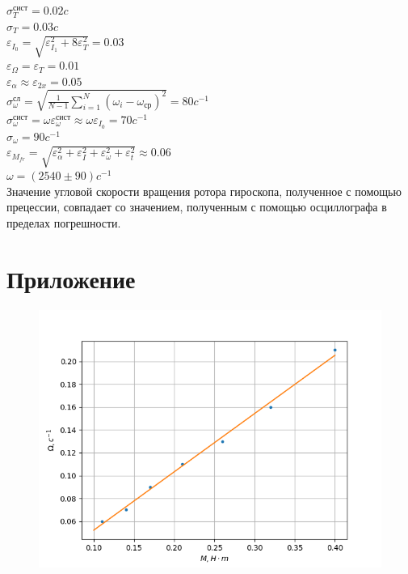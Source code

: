 \documentclass[a4paper, 12pt]{article}
\begin{document}
\begin{enumerate}
    $\sigma^{\text{сист}}_T=0.02c$\\
    $\sigma_T=0.03c$\\
    $\varepsilon_{I_0}=\sqrt{\varepsilon_{I_1}^2+8\varepsilon_{T}^2}=0.03$\\
    $\varepsilon_{\Omega}=\varepsilon_T=0.01$ \\
    $\varepsilon_{\alpha}\approx\varepsilon_{2x}=0.05$\\
    $\sigma^{\text{сл}}_{\omega} = \sqrt{\frac{1}{N - 1} \sum_{i = 1}^{N} \left(\omega_i -  \omega_{ср} \right)^2}=80c^{-1}$\\
    $\sigma^{\text{сист}}_{\omega}=\omega \varepsilon_{\omega}^{сист}\approx\omega\varepsilon_{I_0}=70c^{-1}$\\
    $\sigma_{\omega}=90c^{-1}$\\
    $\varepsilon_{M_{fr}}=\sqrt{\varepsilon_{\alpha}^2+\varepsilon_I^2+\varepsilon_{\omega}^2+\varepsilon_t^2}\approx 0.06$\\
    $\omega=(2540\pm 90)c^{-1}$\\
    Значение угловой скорости вращения ротора гироскопа, полученное с помощью прецессии, совпадает со значением, полученным с помощью осциллографа в пределах погрешности.
    
    
\end{enumerate}
\newpage
\section*{Приложение}
    \begin{figure}[h]
        \centering
        \includegraphics{image/Figure_1.png}
    \end{figure}
\end{document}
